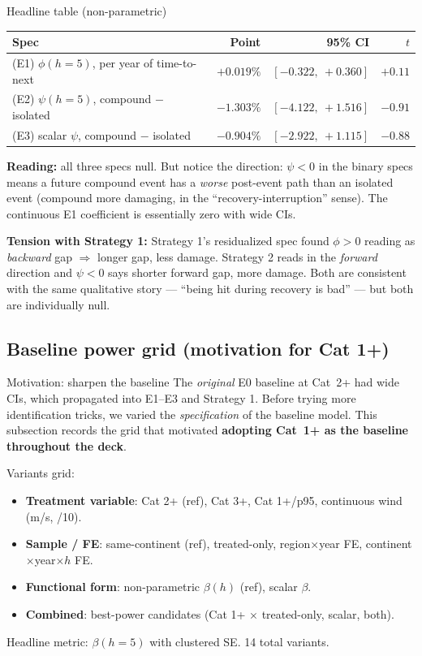 \documentclass[aspectratio=169]{beamer}
\begin{document}
\begin{frame}{Headline table (non-parametric)}
\footnotesize
\centering
\begin{tabular}{l r r r}
\hline
\textbf{Spec} & \textbf{Point} & \textbf{95\% CI} & $t$ \\
\hline
(E1) $\phi(h{=}5)$, per year of time-to-next       & $+0.019\%$ & $[-0.322,\ +0.360]$ & $+0.11$ \\
(E2) $\psi(h{=}5)$, compound $-$ isolated          & $-1.303\%$ & $[-4.122,\ +1.516]$ & $-0.91$ \\
(E3) scalar $\psi$, compound $-$ isolated          & $-0.904\%$ & $[-2.922,\ +1.115]$ & $-0.88$ \\
\hline
\end{tabular}

\medskip
\textbf{Reading:} all three specs null. But notice the direction: $\psi<0$ in the binary specs means a future compound event has a \emph{worse} post-event path than an isolated event (compound more damaging, in the ``recovery-interruption'' sense). The continuous E1 coefficient is essentially zero with wide CIs.

\medskip
\textbf{Tension with Strategy 1:} Strategy 1's residualized spec found $\phi > 0$ reading as \emph{backward} gap $\Rightarrow$ longer gap, less damage. Strategy 2 reads in the \emph{forward} direction and $\psi < 0$ says shorter forward gap, more damage. Both are consistent with the same qualitative story --- ``being hit during recovery is bad'' --- but both are individually null.
\end{frame}

\subsection{Baseline power grid (motivation for Cat 1+)}
\begin{frame}\subsectionpage\end{frame}

\begin{frame}{Motivation: sharpen the baseline}
The \emph{original} E0 baseline at Cat~2+ had wide CIs, which propagated into E1--E3 and Strategy 1. Before trying more identification tricks, we varied the \emph{specification} of the baseline model. This subsection records the grid that motivated \textbf{adopting Cat~1+ as the baseline throughout the deck}.

\medskip
Variants grid:
\begin{itemize}
  \item \textbf{Treatment variable}: Cat 2+ (ref), Cat 3+, Cat 1+/p95, continuous wind (m/s, /10).
  \item \textbf{Sample / FE}: same-continent (ref), treated-only, region$\times$year FE, continent$\times$year$\times h$ FE.
  \item \textbf{Functional form}: non-parametric $\beta(h)$ (ref), scalar $\beta$.
  \item \textbf{Combined}: best-power candidates (Cat 1+ $\times$ treated-only, scalar, both).
\end{itemize}

\medskip
Headline metric: $\beta(h{=}5)$ with clustered SE. 14 total variants.
\end{frame}
\end{document}

